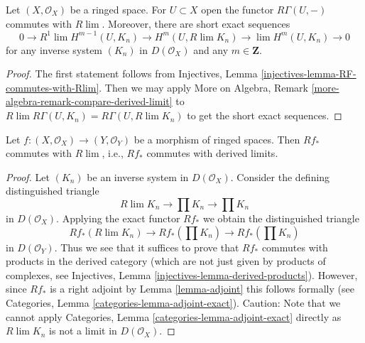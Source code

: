 \begin{lemma}
\label{lemma-RGamma-commutes-with-Rlim}
Let $(X, \mathcal{O}_X)$ be a ringed space. For $U \subset X$ open the
functor $R\Gamma(U, -)$ commutes with $R\lim$. Moreover, there are
short exact sequences
$$
0 \to
R^1\lim H^{m - 1}(U, K_n) \to H^m(U, R\lim K_n) \to
\lim H^m(U, K_n) \to 0
$$
for any inverse system $(K_n)$ in $D(\mathcal{O}_X)$ and any $m \in \mathbf{Z}$.
\end{lemma}

\begin{proof}
The first statement follows from
Injectives, Lemma \ref{injectives-lemma-RF-commutes-with-Rlim}.
Then we may apply 
More on Algebra, Remark \ref{more-algebra-remark-compare-derived-limit}
to $R\lim R\Gamma(U, K_n) = R\Gamma(U, R\lim K_n)$ to get the short
exact sequences.
\end{proof}

\begin{lemma}
\label{lemma-Rf-commutes-with-Rlim}
Let $f : (X, \mathcal{O}_X) \to (Y, \mathcal{O}_Y)$ be a morphism of ringed
spaces. Then $Rf_*$ commutes with $R\lim$, i.e., $Rf_*$ commutes with
derived limits.
\end{lemma}

\begin{proof}
Let $(K_n)$ be an inverse system in $D(\mathcal{O}_X)$. Consider the defining
distinguished triangle
$$
R\lim K_n \to \prod K_n \to \prod K_n
$$
in $D(\mathcal{O}_X)$. Applying the exact functor $Rf_*$ we obtain
the distinguished triangle
$$
Rf_*(R\lim K_n) \to Rf_*\left(\prod K_n\right) \to Rf_*\left(\prod K_n\right)
$$
in $D(\mathcal{O}_Y)$. Thus we see that it suffices to prove that
$Rf_*$ commutes with products in the derived category (which are not just
given by products of complexes, see
Injectives, Lemma \ref{injectives-lemma-derived-products}).
However, since $Rf_*$ is a right adjoint by Lemma \ref{lemma-adjoint}
this follows formally (see
Categories, Lemma \ref{categories-lemma-adjoint-exact}).
Caution: Note that we cannot apply
Categories, Lemma \ref{categories-lemma-adjoint-exact}
directly as $R\lim K_n$ is not a limit in $D(\mathcal{O}_X)$.
\end{proof}

